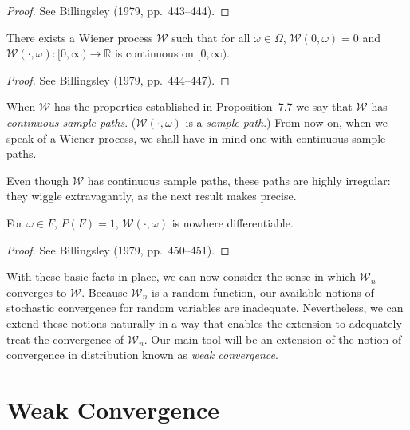 \begin{proof}
See Billingsley (1979, pp.\ 443--444).
\end{proof}

\begin{proposition}\label{prop:wiener-continuous}
There exists a Wiener process $\mathcal{W}$ such that for all $\omega \in \Omega$, $\mathcal{W}(0, \omega) = 0$ and $\mathcal{W}(\cdot, \omega) : [0,\infty) \to \mathbb{R}$ is continuous on $[0,\infty)$.
\end{proposition}

\begin{proof}
See Billingsley (1979, pp.\ 444--447).
\end{proof}

When $\mathcal{W}$ has the properties established in Proposition~7.7 we say that $\mathcal{W}$ has \emph{continuous sample paths}. ($\mathcal{W}(\cdot, \omega)$ is a \emph{sample path}.) From now on, when we speak of a Wiener process, we shall have in mind one with continuous sample paths.

Even though $\mathcal{W}$ has continuous sample paths, these paths are highly irregular: they wiggle extravagantly, as the next result makes precise.

\begin{proposition}\label{prop:wiener-nondiff}
For $\omega \in F$, $P(F) = 1$, $\mathcal{W}(\cdot, \omega)$ is nowhere differentiable.
\end{proposition}

\begin{proof}
See Billingsley (1979, pp.\ 450--451).
\end{proof}

With these basic facts in place, we can now consider the sense in which $\mathcal{W}_n$ converges to $\mathcal{W}$. Because $\mathcal{W}_n$ is a random function, our available notions of stochastic convergence for random variables are inadequate. Nevertheless, we can extend these notions naturally in a way that enables the extension to adequately treat the convergence of $\mathcal{W}_n$. Our main tool will be an extension of the notion of convergence in distribution known as \emph{weak convergence}.

\section{Weak Convergence}\label{sec:weak-convergence}

